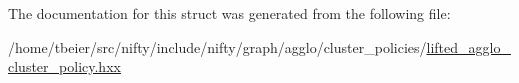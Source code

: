 The documentation for this struct was generated from the following file\+:\begin{DoxyCompactItemize}
\item 
/home/tbeier/src/nifty/include/nifty/graph/agglo/cluster\+\_\+policies/\hyperlink{lifted__agglo__cluster__policy_8hxx}{lifted\+\_\+agglo\+\_\+cluster\+\_\+policy.\+hxx}\end{DoxyCompactItemize}
